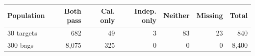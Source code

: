 \begin{tabular}{lrrrrrr}
\toprule
Population & Both pass & Cal. only & Indep. only & Neither & Missing & Total \\
\midrule
30 targets & 682 & 49 & 3 & 83 & 23 & 840 \\
300 bags & 8,075 & 325 & 0 & 0 & 0 & 8,400 \\
\bottomrule
\end{tabular}
